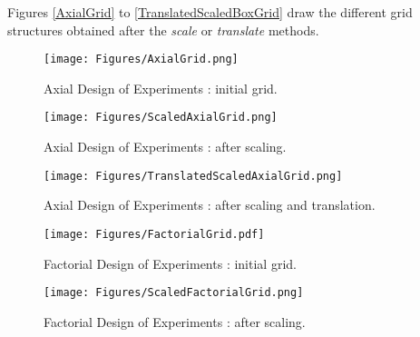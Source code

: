              Figures \ref{AxialGrid} to \ref{TranslatedScaledBoxGrid} draw the different grid structures obtained after the {\itshape scale} or {\itshape translate} methods.

             \begin{figure}[H]
               \begin{minipage}{10cm}
                 \begin{center}
                   \texttt{[image: Figures/AxialGrid.png]}
                   \caption{Axial Design of Experiments  : initial grid.}
                   \label{AxialGrid}
                 \end{center}
               \end{minipage}
               \hfill
               \begin{minipage}{10cm}
                 \begin{center}
                   \texttt{[image: Figures/ScaledAxialGrid.png]}
                   \caption{Axial Design of Experiments  : after scaling.}
                   \label{ScaledAxialGrid}
                 \end{center}
               \end{minipage}
             \end{figure}

             \begin{figure}[H]
               \begin{center}
                 \texttt{[image: Figures/TranslatedScaledAxialGrid.png]}
               \end{center}
               \caption{Axial Design of Experiments  : after scaling and translation.}
               \label{TranslatedScaledAxialGrid}
             \end{figure}



             \begin{figure}[H]
               \begin{minipage}{10cm}
                 \begin{center}
                   \texttt{[image: Figures/FactorialGrid.pdf]}
                   \caption{Factorial Design of Experiments  : initial grid.}
                   \label{FactorialGrid}
                 \end{center}
               \end{minipage}
               \hfill
               \begin{minipage}{10cm}
                 \begin{center}
                   \texttt{[image: Figures/ScaledFactorialGrid.png]}
                   \caption{Factorial Design of Experiments  : after scaling.}
                   \label{ScaledFactorialGrid}
                 \end{center}
               \end{minipage}
             \end{figure}




